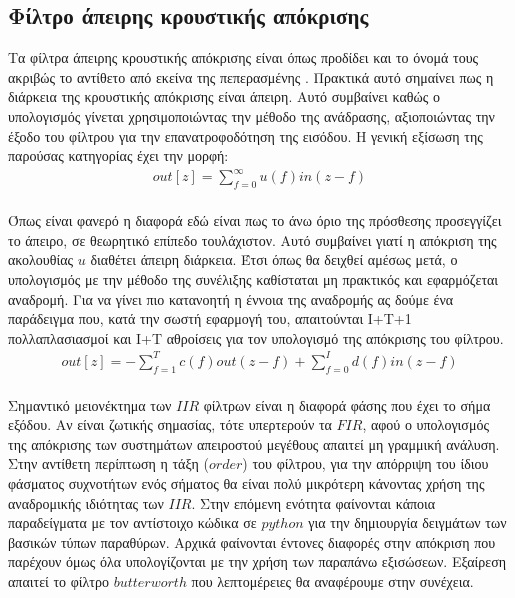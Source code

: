 \documentclass[breaklines=true, 12pt]{article}
\begin{document}
\subsection{Φίλτρο άπειρης κρουστικής απόκρισης}
\label{sec:orgd46d953}
Τα φίλτρα άπειρης κρουστικής απόκρισης είναι όπως προδίδει και το όνομά τους
ακριβώς το αντίθετο από εκείνα της πεπερασμένης . Πρακτικά αυτό σημαίνει
πως η διάρκεια της κρουστικής απόκρισης είναι άπειρη. Αυτό συμβαίνει καθώς ο
υπολογισμός γίνεται χρησιμοποιώντας την μέθοδο της ανάδρασης, αξιοποιώντας την
έξοδο του φίλτρου για την επανατροφοδότηση της εισόδου. Η γενική εξίσωση της
παρούσας κατηγορίας έχει την μορφή:
\begin{equation}
\begin{align}
out[z] = \sum_{f=0}^{\infty}u(f)in(z-f) \\
\end{align}
\end{equation}

Όπως είναι φανερό η διαφορά εδώ είναι πως το άνω όριο της πρόσθεσης προσεγγίζει
το άπειρο, σε θεωρητικό επίπεδο τουλάχιστον. Αυτό συμβαίνει γιατί η απόκριση
της ακολουθίας \(u\) διαθέτει άπειρη διάρκεια. Έτσι όπως θα δειχθεί αμέσως μετά,
ο υπολογισμός με την μέθοδο της συνέλιξης καθίσταται μη πρακτικός και εφαρμόζεται
αναδρομή. Για να γίνει πιο κατανοητή η έννοια της αναδρομής ας δούμε ένα
παράδειγμα που, κατά την σωστή εφαρμογή του, απαιτούνται I+T+1
πολλαπλασιασμοί και I+T αθροίσεις για τον υπολογισμό της απόκρισης του φίλτρου.
\begin{equation}
\begin{align}
out[z] = - \sum_{f=1}^{T}c(f)out(z-f) + \sum_{f=0}^{I}d(f)in(z-f) \\
\end{align}
\end{equation}

Σημαντικό μειονέκτημα των \(IIR\) φίλτρων είναι η διαφορά φάσης που έχει το σήμα
εξόδου. Αν είναι ζωτικής σημασίας, τότε υπερτερούν τα \(FIR\), αφού ο υπολογισμός
της απόκρισης των συστημάτων απειροστού μεγέθους απαιτεί μη γραμμική ανάλυση.
Στην αντίθετη περίπτωση η τάξη (\(order\)) του φίλτρου, για την απόρριψη του ίδιου
φάσματος συχνοτήτων ενός σήματος θα είναι πολύ μικρότερη κάνοντας χρήση της
αναδρομικής ιδιότητας των \(IIR\). Στην επόμενη ενότητα φαίνονται κάποια παραδείγματα
με τον αντίστοιχο κώδικα σε \(python\) για την δημιουργία δειγμάτων των βασικών
τύπων παραθύρων. Αρχικά φαίνονται έντονες διαφορές στην απόκριση που παρέχουν
όμως όλα υπολογίζονται με την χρήση των παραπάνω εξισώσεων. Εξαίρεση απαιτεί
το φίλτρο \(butterworth\) που λεπτομέρειες θα αναφέρουμε στην συνέχεια.
\end{document}

